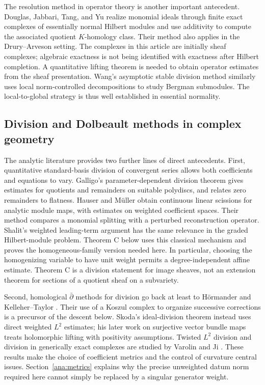 \documentclass[11pt,reqno]{amsart}
\numberwithin{equation}{section}
\theoremstyle{definition}
\theoremstyle{remark}
\begin{document}
The resolution method in operator theory is another important antecedent.
Douglas, Jabbari, Tang, and Yu \cite{DouglasJabbariTangYu} realize monomial
ideals through finite exact complexes of essentially normal Hilbert modules
and use additivity to compute the associated quotient $K$-homology class.
Their method also applies in the Drury--Arveson setting. The complexes in
this article are initially sheaf complexes; algebraic exactness is not
being identified with exactness after Hilbert completion. A quantitative
lifting theorem is needed to obtain operator estimates from the sheaf presentation.
Wang's asymptotic stable division method \cite{YiWang} similarly uses local
norm-controlled decompositions to study Bergman submodules. The local-to-global
strategy is thus well established in essential normality.

\subsection{Division and Dolbeault methods in complex geometry}
The analytic literature provides two further lines of direct antecedents.
First, quantitative standard-basis division of convergent series allows
both coefficients and equations to vary. Galligo's parameter-dependent
division theorem \cite[Theorems~1.2.7--1.2.8]{Galligo} gives estimates for
quotients and remainders on suitable polydiscs, and relates zero remainders
to flatness. Hauser and M\"uller \cite[Theorems~5.1--5.2]{HauserMueller}
obtain continuous linear scissions for analytic module maps, with estimates
on weighted coefficient spaces. Their method compares a monomial splitting
with a perturbed reconstruction operator. Shalit's weighted leading-term
argument \cite[Section~3]{ShalitDivision} has the same relevance in the
graded Hilbert-module problem. Theorem C below uses this classical
mechanism and proves the homogeneous-family version needed here. In
particular, choosing the homogenizing variable to have unit weight permits
a degree-independent affine estimate. Theorem C is a division statement
for image sheaves, not an extension theorem for sections of a quotient
sheaf on a subvariety.

Second, homological $\bar\partial$ methods for division go back at least
to H\"ormander \cite{HormanderGenerators} and Kelleher--Taylor
\cite[Section~II]{KelleherTaylor}. Their use of a Koszul complex to
organize successive corrections is a precursor of the descent below.
Skoda's ideal-division theorem \cite{SkodaDivision} instead uses direct
weighted $L^2$ estimates; his later work on surjective vector bundle maps
\cite{SkodaBundles} treats holomorphic lifting with positivity assumptions.
Twisted $L^2$ division and division in generically exact complexes are
studied by Varolin \cite{Varolin} and Ji \cite{Ji}. These results make the
choice of coefficient metrics and the control of curvature central issues.
Section~\ref{ana:metrics} explains why the precise unweighted datum norm
required here cannot simply be replaced by a singular generator weight.
\end{document}
